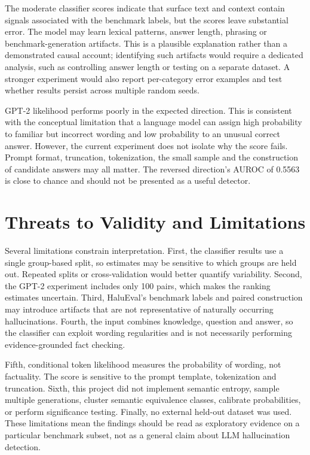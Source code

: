 \documentclass[11pt]{article}
\begin{document}
The moderate classifier scores indicate that surface text and context contain signals associated with the benchmark labels, but the scores leave substantial error. The model may learn lexical patterns, answer length, phrasing or benchmark-generation artifacts. This is a plausible explanation rather than a demonstrated causal account; identifying such artifacts would require a dedicated analysis, such as controlling answer length or testing on a separate dataset. A stronger experiment would also report per-category error examples and test whether results persist across multiple random seeds.

GPT-2 likelihood performs poorly in the expected direction. This is consistent with the conceptual limitation that a language model can assign high probability to familiar but incorrect wording and low probability to an unusual correct answer. However, the current experiment does not isolate why the score fails. Prompt format, truncation, tokenization, the small sample and the construction of candidate answers may all matter. The reversed direction's AUROC of 0.5563 is close to chance and should not be presented as a useful detector.

\section{Threats to Validity and Limitations}
Several limitations constrain interpretation. First, the classifier results use a single group-based split, so estimates may be sensitive to which groups are held out. Repeated splits or cross-validation would better quantify variability. Second, the GPT-2 experiment includes only 100 pairs, which makes the ranking estimates uncertain. Third, HaluEval's benchmark labels and paired construction may introduce artifacts that are not representative of naturally occurring hallucinations. Fourth, the input combines knowledge, question and answer, so the classifier can exploit wording regularities and is not necessarily performing evidence-grounded fact checking.

Fifth, conditional token likelihood measures the probability of wording, not factuality. The score is sensitive to the prompt template, tokenization and truncation. Sixth, this project did not implement semantic entropy, sample multiple generations, cluster semantic equivalence classes, calibrate probabilities, or perform significance testing. Finally, no external held-out dataset was used. These limitations mean the findings should be read as exploratory evidence on a particular benchmark subset, not as a general claim about LLM hallucination detection.
\end{document}
